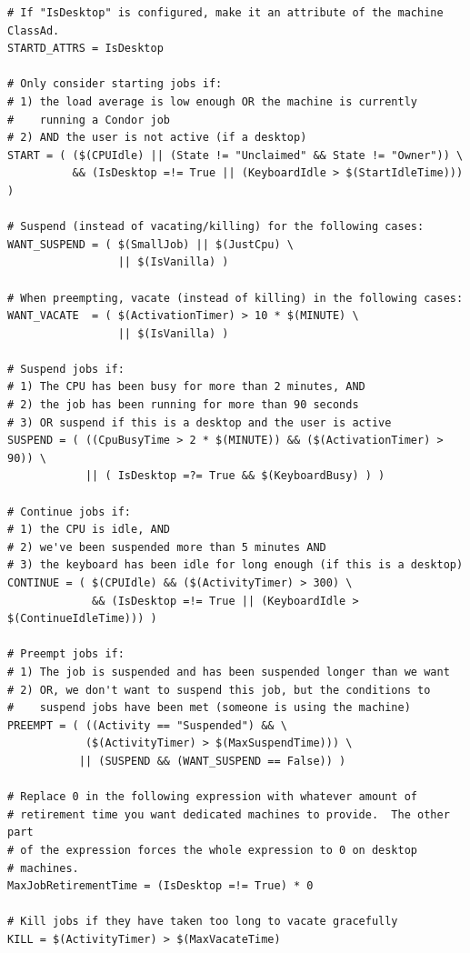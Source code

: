 \begin{verbatim}
# If "IsDesktop" is configured, make it an attribute of the machine ClassAd.
STARTD_ATTRS = IsDesktop

# Only consider starting jobs if:
# 1) the load average is low enough OR the machine is currently
#    running a Condor job
# 2) AND the user is not active (if a desktop)
START = ( ($(CPUIdle) || (State != "Unclaimed" && State != "Owner")) \
          && (IsDesktop =!= True || (KeyboardIdle > $(StartIdleTime))) )

# Suspend (instead of vacating/killing) for the following cases:
WANT_SUSPEND = ( $(SmallJob) || $(JustCpu) \
                 || $(IsVanilla) )

# When preempting, vacate (instead of killing) in the following cases:
WANT_VACATE  = ( $(ActivationTimer) > 10 * $(MINUTE) \
                 || $(IsVanilla) )

# Suspend jobs if:
# 1) The CPU has been busy for more than 2 minutes, AND
# 2) the job has been running for more than 90 seconds
# 3) OR suspend if this is a desktop and the user is active
SUSPEND = ( ((CpuBusyTime > 2 * $(MINUTE)) && ($(ActivationTimer) > 90)) \
            || ( IsDesktop =?= True && $(KeyboardBusy) ) )

# Continue jobs if:
# 1) the CPU is idle, AND 
# 2) we've been suspended more than 5 minutes AND
# 3) the keyboard has been idle for long enough (if this is a desktop)
CONTINUE = ( $(CPUIdle) && ($(ActivityTimer) > 300) \
             && (IsDesktop =!= True || (KeyboardIdle > $(ContinueIdleTime))) )

# Preempt jobs if:
# 1) The job is suspended and has been suspended longer than we want
# 2) OR, we don't want to suspend this job, but the conditions to
#    suspend jobs have been met (someone is using the machine)
PREEMPT = ( ((Activity == "Suspended") && \
            ($(ActivityTimer) > $(MaxSuspendTime))) \
           || (SUSPEND && (WANT_SUSPEND == False)) )

# Replace 0 in the following expression with whatever amount of
# retirement time you want dedicated machines to provide.  The other part
# of the expression forces the whole expression to 0 on desktop
# machines.
MaxJobRetirementTime = (IsDesktop =!= True) * 0

# Kill jobs if they have taken too long to vacate gracefully
KILL = $(ActivityTimer) > $(MaxVacateTime) 

\end{verbatim}

